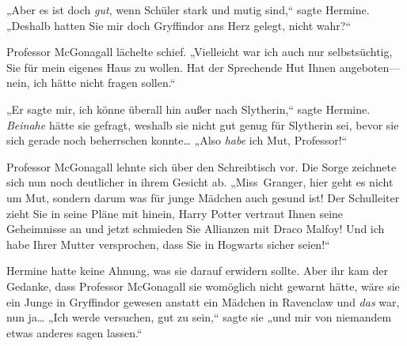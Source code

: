 „Aber es ist doch \emph{gut}, wenn Schüler stark und mutig sind,“ sagte Hermine. „Deshalb hatten Sie mir doch Gryffindor ans Herz gelegt, nicht wahr?“

Professor McGonagall lächelte schief. „Vielleicht war ich auch nur selbstsüchtig, Sie für mein eigenes Haus zu wollen. Hat der Sprechende Hut Ihnen angeboten—nein, ich hätte nicht fragen sollen.“

„Er sagte mir, ich könne überall hin außer nach Slytherin,“ sagte Hermine. \emph{Beinahe} hätte sie gefragt, weshalb sie nicht gut genug für Slytherin sei, bevor sie sich gerade noch beherrschen konnte… „Also \emph{habe} ich Mut, Professor!“

Professor McGonagall lehnte sich über den Schreibtisch vor. Die Sorge zeichnete sich nun noch deutlicher in ihrem Gesicht ab. „Miss~Granger, hier geht es nicht um Mut, sondern darum was für junge Mädchen auch gesund ist! Der Schulleiter zieht Sie in seine Pläne mit hinein, Harry Potter vertraut Ihnen seine Geheimnisse an und jetzt schmieden Sie Allianzen mit Draco Malfoy! Und ich habe Ihrer Mutter versprochen, dass Sie in Hogwarts sicher seien!“

Hermine hatte keine Ahnung, was sie darauf erwidern sollte. Aber ihr kam der Gedanke, dass Professor McGonagall sie womöglich nicht gewarnt hätte, wäre sie ein Junge in Gryffindor gewesen anstatt ein Mädchen in Ravenclaw und \emph{das} war, nun ja… „Ich werde versuchen, gut zu sein,“ sagte sie „und mir von niemandem etwas anderes sagen lassen.“

